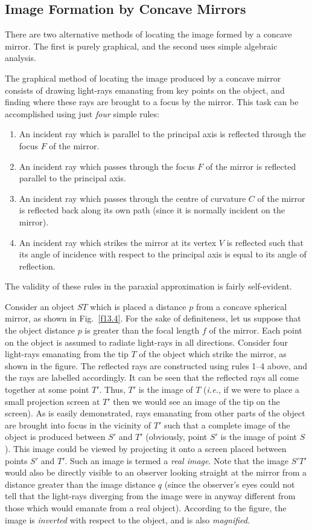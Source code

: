 \subsection{Image Formation by Concave Mirrors}
There are two alternative methods of locating the image
formed by a concave mirror. The first is purely graphical, and the
second uses simple algebraic analysis. 

The graphical method of locating the image produced by a
concave mirror consists of drawing light-rays emanating from
key points on the object, and finding where these rays are brought
to a focus by the mirror. This task can be accomplished
using just {\em four}\/ simple rules:
\begin{enumerate}
\item An incident ray which is parallel to the principal axis is
reflected through the focus $F$ of the mirror.
\item An incident ray which passes through the focus $F$
of the mirror is reflected parallel to the principal axis.
\item An incident ray which passes through the centre of
curvature $C$ of the mirror is reflected back along its own
path (since it is normally incident on the mirror). 
\item An incident ray which strikes the mirror at its
vertex  $V$ is reflected such that its angle of incidence with respect to
the principal axis is equal to its angle of reflection. 
\end{enumerate}
The validity of these rules in the
paraxial approximation is fairly self-evident. 

Consider an object $ST$ which is placed a distance $p$
from a concave spherical mirror, as shown in Fig.~\ref{f13.4}. For the sake of
definiteness, let us suppose that the object distance $p$ is
greater than the focal length $f$ of the mirror. Each point
on the object is assumed to radiate light-rays in all directions.
Consider four light-rays emanating from the tip $T$ of the
object which strike the mirror, as shown in the figure. 
The reflected rays are constructed using rules 1--4 above, and the
rays are labelled accordingly. It can be seen
that the reflected rays all come together at some point $T'$. Thus,
$T'$ is the image of $T$ ({\em i.e.}, if we were to place a small
projection screen at $T'$ then we would see an image of the tip on the
screen). As is easily demonstrated, rays emanating from other parts
of the object are brought into focus in the vicinity of $T'$ such
that a complete image of the object is produced between 
$S'$ and $T'$ (obviously, point $S'$ is the image of point $S$). 
This image could be  viewed by
projecting it onto a screen placed between points
$S'$ and $T'$. Such an image is termed a {\em real image}. 
Note that the image $S'T'$ would also be directly
visible to an observer looking
straight at the mirror from a distance greater than the image
distance $q$ (since the observer's eyes could not
 tell that the light-rays
diverging from the image  were in anyway different from those
which would emanate from a real object). According to the figure, the image is {\em inverted}\/ with respect to the object, and is
also {\em magnified}. 

